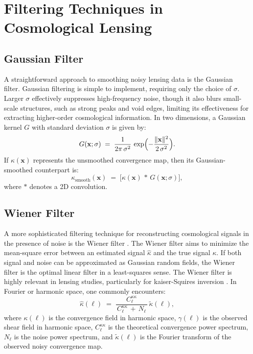 \chapter{Filtering Techniques in Cosmological Lensing}
\label{app:smoothing_filters}

\section{Gaussian Filter}
A straightforward approach to smoothing noisy lensing data is the Gaussian filter. Gaussian filtering is simple to implement, requiring only the choice of \(\sigma\). Larger \(\sigma\) effectively suppresses high-frequency noise, though it also blurs small-scale structures, such as strong peaks and void edges, limiting its effectiveness for extracting higher-order cosmological information.
In two dimensions, a Gaussian kernel \(G\) with standard deviation \(\sigma\) is given by:
\begin{equation}
    G(\mathbf{x}; \sigma)
    \;=\;
    \frac{1}{2\pi \,\sigma^2}\,
    \exp\Bigl(-\frac{\|\mathbf{x}\|^2}{2\,\sigma^2}\Bigr).
\end{equation}
If \(\kappa(\mathbf{x})\) represents the unsmoothed convergence map, then its Gaussian-smoothed counterpart is:
\begin{equation}
    \kappa_{\text{smooth}}(\mathbf{x})
    \;=\;
    \bigl[\kappa(\mathbf{x}) \,\ast\, G(\mathbf{x}; \sigma)\bigr],
\end{equation}
where \(\ast\) denotes a 2D convolution. 

\section{Wiener Filter}
A more sophisticated filtering technique for reconstructing cosmological signals in the presence of noise is the Wiener filter \citep{10.7551/mitpress/2946.001.0001, 2021A&A...649A..99S}. The Wiener filter aims to minimize the mean-square error between an estimated signal \(\widehat{\kappa}\) and the true signal \(\kappa\).  If both signal and noise can be approximated as Gaussian random fields, the Wiener filter is the optimal linear filter in a least-squares sense. The Wiener filter is highly relevant in lensing studies, particularly for kaiser-Squires inversion \citep{1993ApJ...404..441K}.
In Fourier or harmonic space, one commonly encounters:
\begin{equation}
    \widehat{\kappa}(\ell)
    \;=\;
    \frac{C^{\kappa\kappa}_\ell}{\,C^{\kappa\kappa}_\ell \,+\, N_\ell\,}\,
    \tilde{\kappa}(\ell),
    \label{eq:wiener_filter}
\end{equation}
where $\kappa{(\ell)}$ is the convergence field in harmonic space, $\gamma{(\ell)}$ is the observed shear field in harmonic space, $C^{\kappa\kappa}_\ell$ is the theoretical convergence power spectrum, $N_\ell$ is the noise power spectrum, and $\tilde{\kappa}(\ell)$ is the Fourier transform of the observed noisy convergence map.

